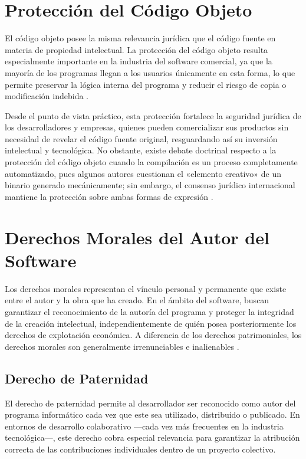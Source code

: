 \documentclass[11pt,a4paper]{report}
\begin{document}
\section{Protección del Código Objeto}

El código objeto posee la misma relevancia jurídica que el código fuente en materia de propiedad intelectual. La protección del código objeto resulta especialmente importante en la industria del software comercial, ya que la mayoría de los programas llegan a los usuarios únicamente en esta forma, lo que permite preservar la lógica interna del programa y reducir el riesgo de copia o modificación indebida \citep{ompi2024}.

Desde el punto de vista práctico, esta protección fortalece la seguridad jurídica de los desarrolladores y empresas, quienes pueden comercializar sus productos sin necesidad de revelar el código fuente original, resguardando así su inversión intelectual y tecnológica. No obstante, existe debate doctrinal respecto a la protección del código objeto cuando la compilación es un proceso completamente automatizado, pues algunos autores cuestionan el «elemento creativo» de un binario generado mecánicamente; sin embargo, el consenso jurídico internacional mantiene la protección sobre ambas formas de expresión \citep{ompi1996, omc1994}.

\section{Derechos Morales del Autor del Software}

Los derechos morales representan el vínculo personal y permanente que existe entre el autor y la obra que ha creado. En el ámbito del software, buscan garantizar el reconocimiento de la autoría del programa y proteger la integridad de la creación intelectual, independientemente de quién posea posteriormente los derechos de explotación económica. A diferencia de los derechos patrimoniales, los derechos morales son generalmente irrenunciables e inalienables \citep{ompi2024}.

\subsection{Derecho de Paternidad}

El derecho de paternidad permite al desarrollador ser reconocido como autor del programa informático cada vez que este sea utilizado, distribuido o publicado. En entornos de desarrollo colaborativo —cada vez más frecuentes en la industria tecnológica—, este derecho cobra especial relevancia para garantizar la atribución correcta de las contribuciones individuales dentro de un proyecto colectivo.
\end{document}
